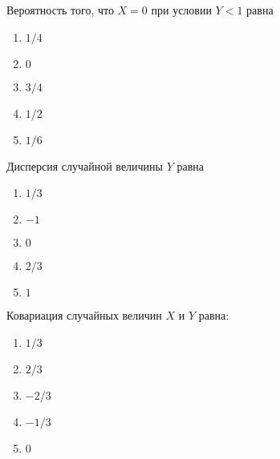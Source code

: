 \documentclass[t]{beamer}
\begin{document}
 \begin{frame} \label{30} 
\begin{block}{30} 

Вероятность того, что $X=0$ при условии $Y<1$ равна
  


 \end{block} 
\begin{enumerate} 
\item[] \hyperlink{30-Yes}{\beamergotobutton{} $1/4$}
\item[] \hyperlink{30-No}{\beamergotobutton{} $0$}
\item[] \hyperlink{30-No}{\beamergotobutton{} $3/4$
}
\item[] \hyperlink{30-No}{\beamergotobutton{} $1/2$}
\item[] \hyperlink{30-No}{\beamergotobutton{} $1/6$}
\end{enumerate} 
\end{frame} 


 \begin{frame} \label{31} 
\begin{block}{31} 

  Дисперсия случайной величины $Y$ равна
  


 \end{block} 
\begin{enumerate} 
\item[] \hyperlink{31-No}{\beamergotobutton{} $1/3$}
\item[] \hyperlink{31-No}{\beamergotobutton{} $-1$}
\item[] \hyperlink{31-No}{\beamergotobutton{} $0$}
\item[] \hyperlink{31-Yes}{\beamergotobutton{} $2/3$}
\item[] \hyperlink{31-No}{\beamergotobutton{} $1$}
\end{enumerate} 
\end{frame} 


 \begin{frame} \label{32} 
\begin{block}{32} 

 Ковариация случайных величин $X$ и $Y$ равна:
  


 \end{block} 
\begin{enumerate} 
\item[] \hyperlink{32-No}{\beamergotobutton{} $1/3$}
\item[] \hyperlink{32-No}{\beamergotobutton{} $2/3$}
\item[] \hyperlink{32-No}{\beamergotobutton{} $-2/3$}
\item[] \hyperlink{32-Yes}{\beamergotobutton{} $-1/3$}
\item[] \hyperlink{32-No}{\beamergotobutton{} $0$}
\end{enumerate} 
\end{frame} 
\end{document}
